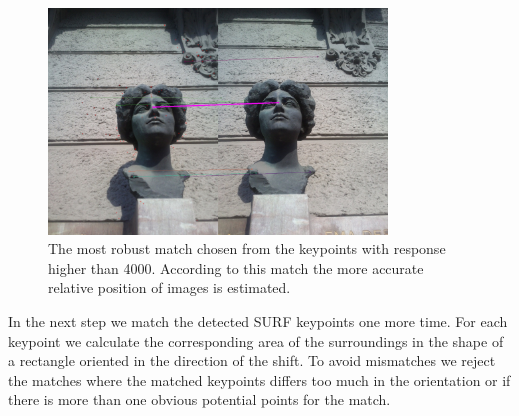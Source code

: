 
\begin{figure}[h]
\centerline{
\includegraphics[width=9cm]{img/ema_direction.png}}
\caption{The most robust match chosen from the keypoints with response higher than 4000. According to this match the more accurate relative position of images is estimated.}
\label{fig:robust_match}
\end{figure}

In the next step we match the detected SURF keypoints one more time.
For each keypoint we calculate the corresponding area of the surroundings in the shape of a rectangle oriented in the direction of the shift. 
To avoid mismatches we reject the matches where the matched keypoints differs too much in the orientation or if there is more than one obvious potential points for the match.


